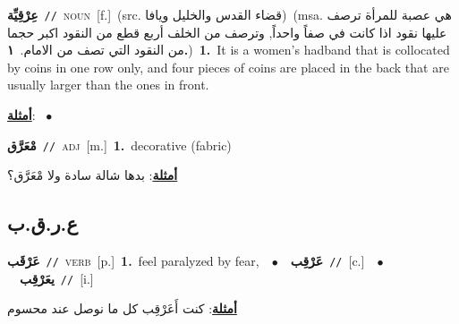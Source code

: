 \documentclass[10pt,a4paper,twoside]{article} %
\begin{document}
\begin{multicols}{2}
{\setlength\topsep{0pt}\textbf{\foreignlanguage{arabic}{عِرْقِيِّة}}\ {\color{gray}\texttt{//}\color{black}}\ \textsc{noun}\ [f.]\ (src. \color{gray}\foreignlanguage{arabic}{قضاء القدس والخليل ويافا}\color{black})\ \color{gray}(msa. \foreignlanguage{arabic}{هي عصبة للمرأة ترصف عليها نقود اذا كانت في صفاً واحداً, وترصف من الخلف أربع قطع من النقود اكبر حجما من النقود التي تصف من الامام.}~\foreignlanguage{arabic}{\textbf{١.}})\color{black}\ \textbf{1.}~It is a women's hadband that is collocated by coins in one row only, and four pieces of coins are placed in the back that are usually larger than the ones in front.\  \begin{flushright}\color{gray}\foreignlanguage{arabic}{\textbf{\underline{\foreignlanguage{arabic}{أمثلة}}}: \ $\bullet$\ \  }\end{flushright}\color{black}} \vspace{2mm}

{\setlength\topsep{0pt}\textbf{\foreignlanguage{arabic}{مْعَرَّق}}\ {\color{gray}\texttt{//}\color{black}}\ \textsc{adj}\ [m.]\ \textbf{1.}~decorative (fabric)\  \begin{flushright}\color{gray}\foreignlanguage{arabic}{\textbf{\underline{\foreignlanguage{arabic}{أمثلة}}}: بدها شالة سادة ولا مْعَرَّق؟}\end{flushright}\color{black}} \vspace{2mm}

\vspace{-3mm}
\subsection*{\color{blue}\foreignlanguage{arabic}{ع.ر.ق.ب}\color{blue}{}} 

{\setlength\topsep{0pt}\textbf{\foreignlanguage{arabic}{عَرْقَب}}\ {\color{gray}\texttt{//}\color{black}}\ \textsc{verb}\ [p.]\ \textbf{1.}~feel paralyzed by fear,\ \ $\bullet$\ \ \setlength\topsep{0pt}\textbf{\foreignlanguage{arabic}{عَرْقِب}}\ {\color{gray}\texttt{//}\color{black}}\ [c.]\ \ $\bullet$\ \ \setlength\topsep{0pt}\textbf{\foreignlanguage{arabic}{يعَرْقِب}}\ {\color{gray}\texttt{//}\color{black}}\ [i.]\  \begin{flushright}\color{gray}\foreignlanguage{arabic}{\textbf{\underline{\foreignlanguage{arabic}{أمثلة}}}: كنت أَعَرْقِب كل ما نوصل عند محسوم}\end{flushright}\color{black}} \vspace{2mm}


\end{multicols}
\end{document}
